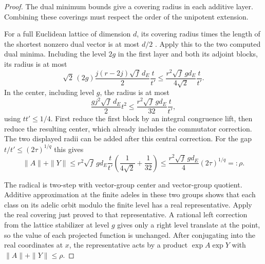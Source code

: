 \begin{proof}

The dual minimum bounds give a covering radius in each additive layer. Combining these coverings must respect the order of the unipotent extension.


For a full Euclidean lattice of dimension \(d\), its
covering radius times the length of the shortest nonzero
dual vector is at most \(d/2\)
\cite[Theorem~2.2]{banaszczyk}. Apply this to the two
computed dual minima. Including the level \(2g\) in the
first layer and both its adjoint blocks, its radius is at most
\[
 \sqrt2\,(2g)\frac{j(r-2j)\sqrt f\,d_E}{2}\frac{t}{t'}
        \le\frac{r^2\sqrt f\,g d_E}{4\sqrt2}\frac{t}{t'} .
\]
In the center, including level \(g\), the radius is at most
\[
        \frac{g j^2\sqrt f\,d_E}{2}t^2
        \le\frac{r^2\sqrt f\,g d_E}{32}\frac{t}{t'} ,
\]
using \(t t'\le1/4\). First reduce the first block by an
integral congruence lift, then reduce the resulting center,
which already includes the commutator correction.
The two displayed radii can be added after this central correction.
For the gap \(t/t'\le(2\tau)^{1/q}\) this gives
\[
 \|A\|+\|Y\|\le r^2\sqrt f\,g d_E\frac{t}{t'}
       \left(\frac{1}{4\sqrt2}+\frac1{32}\right)
 \le \frac{r^2\sqrt f\,g d_E}{4}(2\tau)^{1/q}=:\rho .
\]

The radical is two-step with vector-group center and
vector-group quotient. Additive approximation at the
finite adeles in these two groups shows that each class
on its adelic orbit modulo the finite level has a real
representative. Apply the real covering just proved to
that representative. A rational left correction from
the lattice stabilizer at level \(g\) gives only a right
level translate at the point, so the value of each projected
function is unchanged. After conjugating into the real
coordinates at \(x\), the representative acts by a product
\(\exp A\exp Y\) with \(\|A\|+\|Y\|\le\rho\).
\end{proof}
